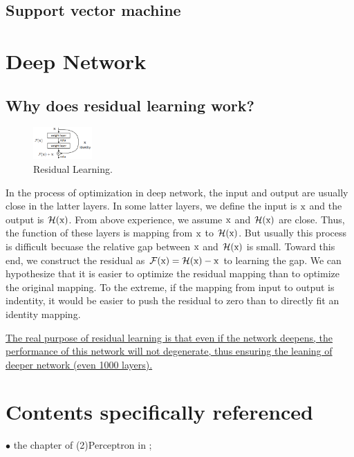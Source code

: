 \documentclass[10pt,onecolumn]{book}
\begin{document}
\section{Support vector machine}


\chapter{Deep Network}
\section{Why does residual learning work?}
\begin{figure}[h]
\centering
\includegraphics[width=0.2\textwidth]{figures/residual_learning_block.png}
\caption{Residual Learning.}
\label{fig:1-1_residual_learning}
\end{figure}

In the process of optimization in deep network, the input and output are usually close in the latter layers. In some latter layers, we define the input is $\rm{x}$ and the output is $\mathcal{H(\rm{x})}$. From above experience, we assume $\rm{x}$ and $\mathcal{H(\rm{x})}$ are close. Thus, the function of these layers is mapping from $\rm{x}$ to $\mathcal{H(\rm{x})}$. But usually this process is difficult becuase the relative gap between $\rm{x}$ and $\mathcal{H(\rm{x})}$ is small. Toward this end, we construct the residual as \uline{$\mathcal{F(\rm{x})} = \mathcal{H(\rm{x})} - \rm{x}$} to learning the gap. We can hypothesize that it is easier to optimize the residual mapping than to optimize the original mapping. To the extreme, if the mapping from input to output is indentity, it would be easier to push the residual to zero than to directly fit an identity mapping.

\uline{The real purpose of residual learning is that even if the network deepens, the performance of this network will not degenerate, thus ensuring the leaning of deeper network (even 1000 layers).}

\chapter{Contents specifically referenced}
$\bullet$ the chapter of (2)Perceptron in \cite{hangli2012};

{\small


}
\end{document}
